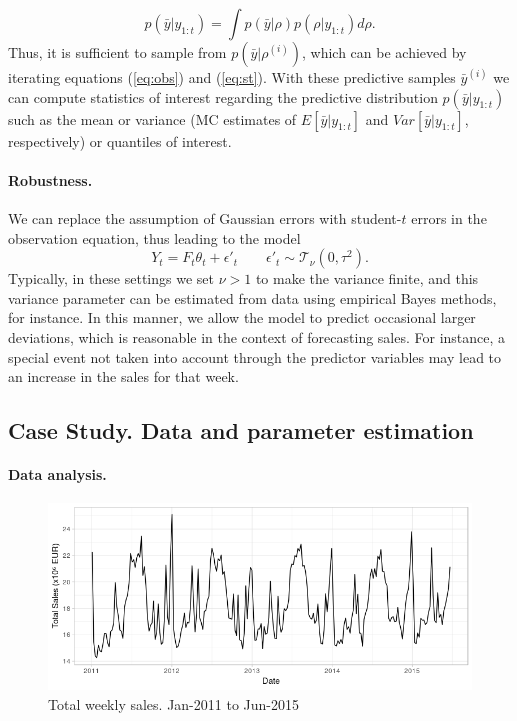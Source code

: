 \[
p(\bar{y} | y_{1:t}) = \int p(\bar{y}| \rho)p(\rho | y_{1:t}) d\rho.
\]
Thus, it is sufficient to sample from $p(\bar{y}| \rho^{(i)})$, which can be achieved by iterating equations (\ref{eq:obs}) and (\ref{eq:st}). With these predictive samples $\bar{y}^{(i)}$ we can compute statistics of interest regarding the predictive distribution   $p(\bar{y} | y_{1:t})$ such as the mean or variance (MC estimates of $E[ \bar{y} | y_{1:t}]$ and $Var[\bar{y} | y_{1:t}]$, respectively) or quantiles of interest.\\


\paragraph{Robustness.}

We can replace the assumption of Gaussian errors with student-$t$ errors in the observation equation, thus leading to the model
$$ 
Y_{t} = F_t \theta_t + \epsilon'_t \qquad \epsilon'_t \sim \mathcal{T}_\nu(0, \tau^2).
$$
Typically, in these settings we set $\nu > 1$ to make the variance finite, and this variance parameter can be estimated from data using empirical Bayes methods, for instance.
In this manner, we allow the model to predict occasional larger deviations, which is reasonable in the context of forecasting sales. For instance, a special event not taken into account through the predictor variables may lead to an increase in the sales for that week.


\subsection{Case Study. Data and parameter estimation}

\paragraph{Data analysis.}


\begin{figure}[h]
\centering
\includegraphics[scale=0.6]{figures/01_Sales.png}
\caption{Total weekly sales. Jan-2011 to Jun-2015}\label{fig:sales}
\end{figure}



